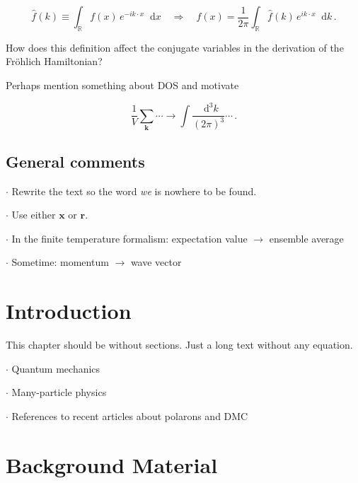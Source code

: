 \documentclass[12pt]{report}
\renewcommand{\vec}[1]{\boldsymbol{\mathbf{#1}}}                        %
\newcommand*\diff{\mathop{}\!\mathrm{d}}
\newcommand{\question}[1]{{\leavevmode\color{question}#1}}
\newcommand{\todo}[1]{{\leavevmode\color{todo}#1}}
\begin{document}
\begin{equation}
	\hat f(k)
	\equiv \int_\mathbb{R} f(x) \,e^{-i k \cdot x} \diff x
	\quad \Rightarrow \quad
	f(x)
	= \frac{1}{2\pi} \int_\mathbb{R} \hat f(k) \, e^{i k \cdot x} \diff k \,.
\end{equation}

\question{How does this definition affect the conjugate variables in the derivation of the Fröhlich Hamiltonian?}

\todo{
Perhaps mention something about DOS and motivate

\begin{equation}
	\frac{1}{V} \sum_{\vec k} \cdots \rightarrow \int \frac{\diff^3k}{(2\pi)^3} \cdots \,.
\end{equation}

}



\section*{General comments}

\todo{$ \cdot $ Rewrite the text so the word \textit{we} is nowhere to be found.}

\todo{$ \cdot $ Use either $ \vec x $ or $ \vec r $.}

\todo{$ \cdot $ In the finite temperature formalism: expectation value $ \rightarrow $ ensemble average}

\todo{$ \cdot $ Sometime: momentum $ \rightarrow $ wave vector}



\tableofcontents

\chapter{Introduction}

\todo{This chapter should be without sections. Just a long text without any equation.}

\todo{$ \cdot $ Quantum mechanics}

\todo{$ \cdot $ Many-particle physics}

\todo{$ \cdot $ References to recent articles about polarons and DMC}



\chapter{Background Material}
\end{document}
